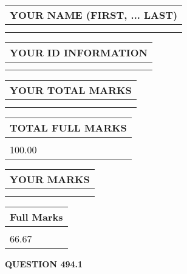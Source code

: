\documentclass{ctexart}
\begin{document}
   
   
   
\newpage 
\setcounter{page}{ 
   494001 } 
   
   
   
   
\noindent\begin{tabular}{|l|}
\hline
YOUR NAME (FIRST, ... LAST)  \\
\hline
 \\ 
 \\ 
\hline
\end{tabular}
\hspace{0.05in} \begin{tabular}{|l|}
\hline
 YOUR   ID   INFORMATION  \\
\hline
 \\ 
 \\ 
\hline
\end{tabular}
   
   
\vspace{0.2in}\noindent\begin{tabular}{|l|}
\hline
YOUR TOTAL MARKS  \\
\hline
 \\ 
 \\ 
\hline
\end{tabular}
\hspace{0.05in} \begin{tabular}{|l|}
\hline
TOTAL FULL MARKS  \\
\hline
 \\ 
100.00 \\
\hline
\end{tabular}
   
   
 \vspace{0.2in}
 
 
 
 
   
   
  
\vspace{0.2in}
  
\noindent\begin{tabular}{|l|}
\hline
 YOUR MARKS  \\
\hline
 \\ 
 \\ 
\hline
\end{tabular}
\hspace{0.05in} \begin{tabular}{|l|}
\hline
 Full Marks  \\
\hline
 \\ 
66.67 \\
\hline
\end{tabular}
{\textbf{\Large{QUESTION
494.1 
}}}
  
\end{document}
